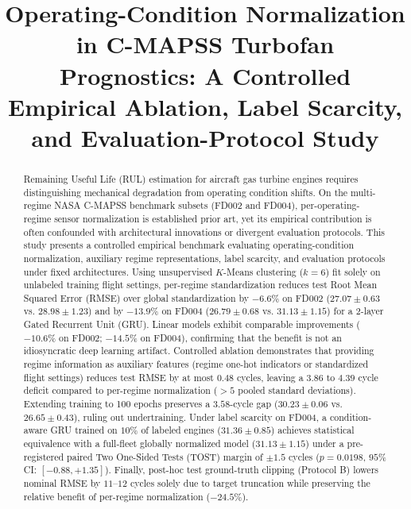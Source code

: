 \documentclass[conference]{IEEEtran}
\begin{document}
\title{Operating-Condition Normalization in C-MAPSS Turbofan Prognostics: A Controlled Empirical Ablation, Label Scarcity, and Evaluation-Protocol Study}

\author{
}

\maketitle

\begin{abstract}
Remaining Useful Life (RUL) estimation for aircraft gas turbine engines requires distinguishing mechanical degradation from operating condition shifts. On the multi-regime NASA C-MAPSS benchmark subsets (FD002 and FD004), per-operating-regime sensor normalization is established prior art, yet its empirical contribution is often confounded with architectural innovations or divergent evaluation protocols. This study presents a controlled empirical benchmark evaluating operating-condition normalization, auxiliary regime representations, label scarcity, and evaluation protocols under fixed architectures. Using unsupervised $K$-Means clustering ($k=6$) fit solely on unlabeled training flight settings, per-regime standardization reduces test Root Mean Squared Error (RMSE) over global standardization by $-6.6\%$ on FD002 ($27.07 \pm 0.63$ vs. $28.98 \pm 1.23$) and by $-13.9\%$ on FD004 ($26.79 \pm 0.68$ vs. $31.13 \pm 1.15$) for a 2-layer Gated Recurrent Unit (GRU). Linear models exhibit comparable improvements ($-10.6\%$ on FD002; $-14.5\%$ on FD004), confirming that the benefit is not an idiosyncratic deep learning artifact. Controlled ablation demonstrates that providing regime information as auxiliary features (regime one-hot indicators or standardized flight settings) reduces test RMSE by at most $0.48$ cycles, leaving a $3.86$ to $4.39$ cycle deficit compared to per-regime normalization ($>5$ pooled standard deviations). Extending training to 100 epochs preserves a $3.58$-cycle gap ($30.23 \pm 0.06$ vs. $26.65 \pm 0.43$), ruling out undertraining. Under label scarcity on FD004, a condition-aware GRU trained on $10\%$ of labeled engines ($31.36 \pm 0.85$) achieves statistical equivalence with a full-fleet globally normalized model ($31.13 \pm 1.15$) under a pre-registered paired Two One-Sided Tests (TOST) margin of $\pm 1.5$ cycles ($p = 0.0198$, $95\%$ CI: $[-0.88, +1.35]$). Finally, post-hoc test ground-truth clipping (Protocol B) lowers nominal RMSE by $11$--$12$ cycles solely due to target truncation while preserving the relative benefit of per-regime normalization ($-24.5\%$).
\end{abstract}
\end{document}
